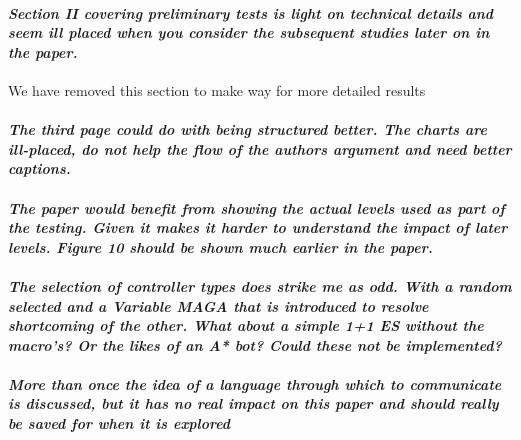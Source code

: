\documentclass{article}
\begin{document}
\paragraph*{\textit{Section II covering preliminary tests is light on technical details and seem ill placed when you consider the subsequent studies later on in the paper.}}
We have removed this section to make way for more detailed results
\paragraph*{\textit{The third page could do with being structured better.  The charts are ill-placed, do not help the flow of the authors argument and need better captions.}}
\paragraph*{\textit{The paper would benefit from showing the actual levels used as part of the testing.  Given it makes it harder to understand the impact of later levels.  Figure 10 should be shown much earlier in the paper.}}
\paragraph*{\textit{The selection of controller types does strike me as odd.  With a random selected and a Variable MAGA that is introduced to resolve shortcoming of the other.  What about a simple 1+1 ES without the macro's?  Or the likes of an A* bot?  Could these not be implemented?}}
\paragraph*{\textit{More than once the idea of a language through which to communicate is discussed, but it has no real impact on this paper and should really be saved for when it is explored}}
\end{document}

